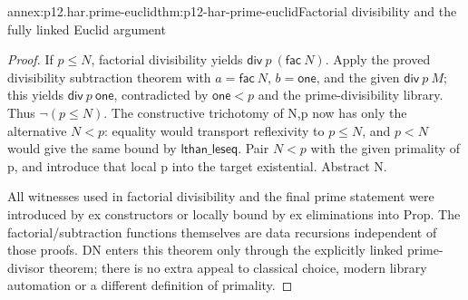\begin{annexitem}{annex:p12.har.prime-euclid}{thm:p12-har-prime-euclid}{Factorial divisibility and the fully linked Euclid argument}
\begin{proof}
If \(p\le N\), factorial divisibility yields
\(\mathsf{div}\ p\ (\mathsf{fac}\ N)\). Apply the proved
divisibility subtraction theorem with
\(a=\mathsf{fac}\ N\), \(b=\mathsf{one}\), and the given
\(\mathsf{div}\ p\ M\); this yields
\(\mathsf{div}\ p\ \mathsf{one}\), contradicted by
\(\mathsf{one}<p\) and the prime-divisibility library.
Thus \(\neg(p\le N)\). The constructive trichotomy of N,p now
has only the alternative \(N<p\): equality would transport
reflexivity to \(p\le N\), and \(p<N\) would give the same
bound by \(\mathsf{lthan\_leseq}\). Pair \(N<p\) with the given primality of p,
and introduce that local p into the target existential. Abstract N.

All witnesses used in factorial divisibility and the final prime
statement were introduced by ex constructors or locally bound by ex
eliminations into Prop. The factorial/subtraction functions themselves
are data recursions independent of those proofs. DN enters this theorem
only through the explicitly linked prime-divisor theorem; there is no
extra appeal to classical choice, modern library automation or a
different definition of primality.


\end{proof}
\end{annexitem}
